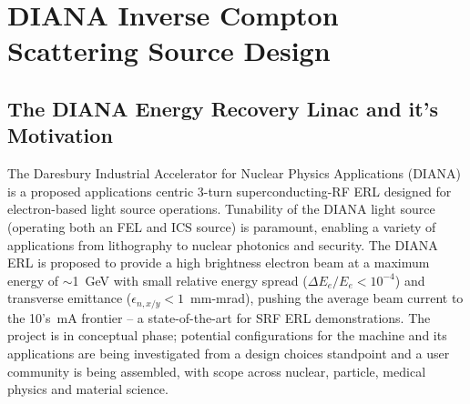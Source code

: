 \documentclass[../main.tex]{subfiles}
\begin{document}
\chapter{DIANA Inverse Compton Scattering Source Design}
\label{DIANA_Inverse_Compton_Source_Design} %

\section{The DIANA Energy Recovery Linac and it's Motivation}

The Daresbury Industrial Accelerator for Nuclear Physics Applications (DIANA) is a proposed applications centric 3-turn superconducting-RF ERL designed for electron-based light source operations. Tunability of the DIANA light source (operating both an FEL and ICS source) is paramount, enabling a variety of applications from lithography to nuclear photonics and security. The DIANA ERL is proposed to provide a high brightness electron beam at a maximum energy of $\sim$1~\si{\giga\electronvolt} with small relative energy spread ($\Delta E_{e}/E_{e} < 10^{-4}$) and transverse emittance ($\epsilon_{n,x/y}< 1$~\si{\milli\meter}-\si{\milli\radian}), pushing the average beam current to the 10's~\si{\milli\ampere} frontier -- a state-of-the-art for SRF ERL demonstrations. The project is in conceptual phase; potential configurations for the machine and its applications are being investigated from a design choices standpoint and a user community is being assembled, with scope across nuclear, particle, medical physics and material science.  
\end{document}

